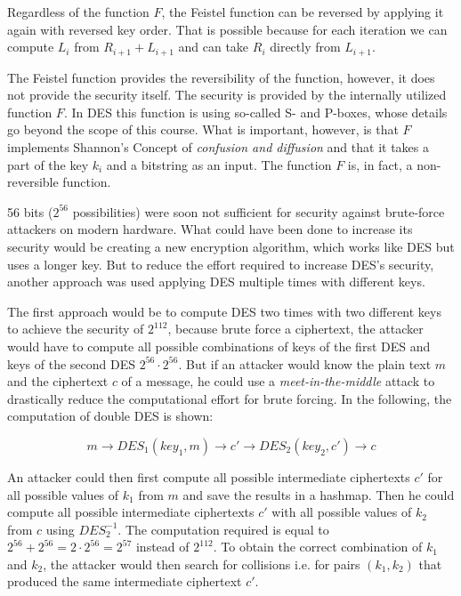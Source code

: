 Regardless of the function $F$, the Feistel function can be reversed by applying it again with reversed key order. That is possible because for each iteration we can compute $L_i$ from $R_{i+1} + L_{i+1}$ and can take $R_i$ directly from $L_{i+1}$.

The Feistel function provides the reversibility of the function, however, it does not provide the security itself. The security is provided by the internally utilized function $F$. In DES this function is using so-called S- and P-boxes, whose details go beyond the scope of this course. What is important, however, is that $F$ implements Shannon's Concept of \textit{confusion and diffusion} and that it takes a part of the key $k_i$ and a bitstring as an input. The function $F$ is, in fact, a non-reversible function.

56 bits ($2^{56}$ possibilities) were soon not sufficient for security against brute-force attackers on modern hardware. What could have been done to increase its security would be creating a new encryption algorithm, which works like DES but uses a longer key. But to reduce the effort required to increase DES's security, another approach was used \textendash{} applying DES multiple times with different keys.

The first approach would be to compute DES two times with two different keys to achieve the security of $2^{112}$, because brute force a ciphertext, the attacker would have to compute all possible combinations of keys of the first DES and keys of the second DES $2^{56} \cdot 2^{56}$. But if an attacker would know the plain text $m$ and the ciphertext $c$ of a message, he could use a \textit{meet-in-the-middle} attack to drastically reduce the computational effort for brute forcing. In the following, the computation of double DES is shown:

$$
    m \rightarrow DES_{1}(key_1, m) \rightarrow c' \rightarrow DES_{2}(key_2, c') \rightarrow c
$$

An attacker could then first compute all possible intermediate ciphertexts $c'$ for all possible values of $k_1$ from $m$ and save the results in a hashmap. Then he could compute all possible intermediate ciphertexts $c'$ with all possible values of $k_2$ from $c$ using $DES_2^{-1}$. The computation required is equal to $2^{56} + 2^{56} = 2 \cdot 2^{56} = 2^{57}$ instead of $2^{112}$. To obtain the correct combination of $k_1$ and $k_2$, the attacker would then search for collisions i.e. for pairs $(k_1, k_2)$ that produced the same intermediate ciphertext $c'$.

